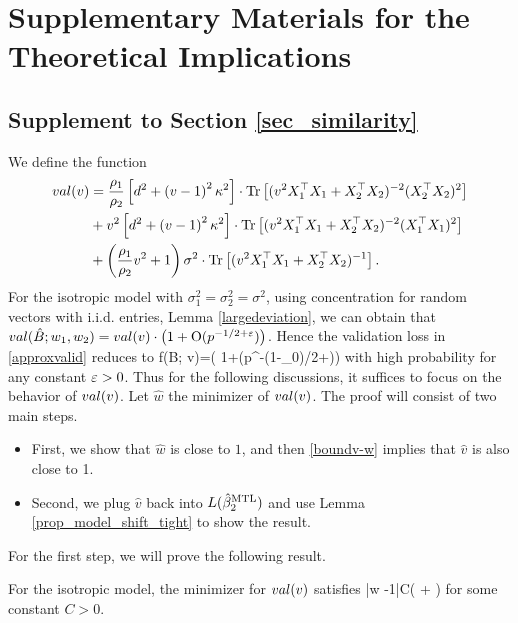\section{Supplementary Materials for the Theoretical Implications}

\subsection{Supplement to Section \ref{sec_similarity}}\label{app_proof_31}

We define the function
\begin{align}
	val(v) &= \frac{\rho_1}{\rho_2}\left[d^2 +\left( v-1\right)^2\kappa^2\right]\cdot \operatorname{Tr}\left[( v^2X_1^{\top}X_1 +X_2^{\top}X_2)^{-2} (X_2^{\top}X_2)^2\right] \nonumber \\
	& +  v^2\left[d^2 +\left( v-1\right)^2\kappa^2\right]\cdot \operatorname{Tr}\left[( v^2X_1^{\top}X_1 +X_2^{\top}X_2)^{-2} (X_1^{\top}X_1)^2\right] \nonumber\\
			& + \left(\frac{\rho_1}{\rho_2} v^2 + 1\right)\sigma^2 \cdot \operatorname{Tr}\left[(v^2X_1^{\top}X_1  + X_2^{\top}X_2)^{-1} \right]. \nonumber
\end{align}
For the isotropic model with $\sigma_1^2=\sigma_2^2=\sigma^2$, using concentration for random vectors with i.i.d. entries, Lemma \ref{largedeviation}, we can obtain that $val(\hat{B}; w_1, w_2)= val(v) \cdot \left( 1+\operatorname{O}(p^{-1/2+{\varepsilon}})\right)$. Hence the validation loss in \eqref{approxvalid} reduces to
\be\label{boundv-w}
\wt f(\hat B; v)=\cdot \left( 1+\OO(p^{-(1-\e_0)/2+\e})\right)
\ee
with high probability for any constant ${\varepsilon}>0$. \nc Thus for the following discussions, it suffices to focus on the behavior of $val (v)$. Let $\hat w$ the minimizer of $val(v)$. The proof will consist of two main steps.
\begin{itemize}
	\item First, we show that $\hat{w}$ is close to $1$, and then \eqref{boundv-w} implies that $\hat v$ is also close to 1.
	\item Second, we plug $\hat{v}$ back into $L(\hat{\beta}_2^{\text{MTL}})$ and use Lemma \ref{prop_model_shift_tight} to show the result.
\end{itemize}
For the first step, we will prove the following result. 
\begin{lemma}\label{lem_hat_v}
For the isotropic model, the minimizer for $val(v)$ satisfies
	\be\label{hatw_add1}|\hat w -1|\le C\left( + \right)\quad {}\ee
	for some constant $C>0$.
\end{lemma}
